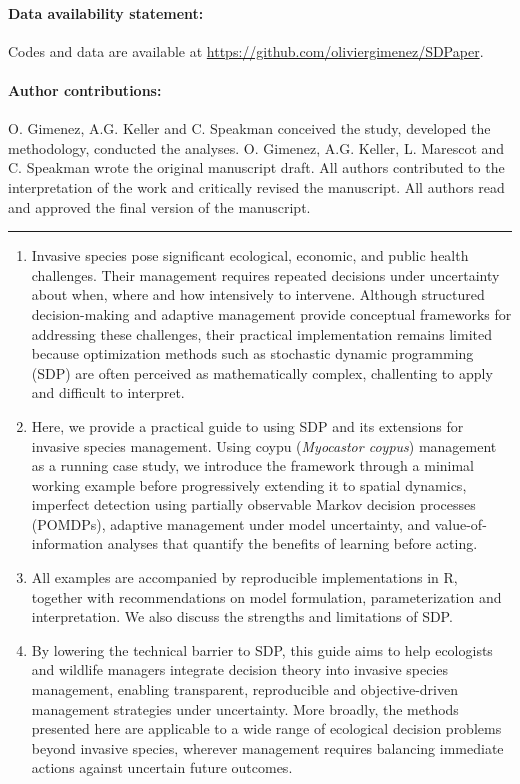 \documentclass[
  11pt,
  a4paper,
]{article}
\begin{document}
\paragraph{Data availability statement:}

Codes and data are available at \url{https://github.com/oliviergimenez/SDPaper}.

\paragraph{Author contributions:}

O. Gimenez, A.G. Keller and C. Speakman conceived the study, developed the methodology, conducted the analyses. O. Gimenez, A.G. Keller, L. Marescot and C. Speakman wrote the original manuscript draft. All authors contributed to the interpretation of the work and critically revised the manuscript. All authors read and approved the final version of the manuscript.

\newpage

\hrule

\begin{enumerate}
\def\labelenumi{\arabic{enumi}.}
\item
  Invasive species pose significant ecological, economic, and public health challenges. Their management requires repeated decisions under uncertainty about when, where and how intensively to intervene. Although structured decision-making and adaptive management provide conceptual frameworks for addressing these challenges, their practical implementation remains limited because optimization methods such as stochastic dynamic programming (SDP) are often perceived as mathematically complex, challenting to apply and difficult to interpret.
\item
  Here, we provide a practical guide to using SDP and its extensions for invasive species management. Using coypu (\emph{Myocastor coypus}) management as a running case study, we introduce the framework through a minimal working example before progressively extending it to spatial dynamics, imperfect detection using partially observable Markov decision processes (POMDPs), adaptive management under model uncertainty, and value-of-information analyses that quantify the benefits of learning before acting.
\item
  All examples are accompanied by reproducible implementations in R, together with recommendations on model formulation, parameterization and interpretation. We also discuss the strengths and limitations of SDP.
\item
  By lowering the technical barrier to SDP, this guide aims to help ecologists and wildlife managers integrate decision theory into invasive species management, enabling transparent, reproducible and objective-driven management strategies under uncertainty. More broadly, the methods presented here are applicable to a wide range of ecological decision problems beyond invasive species, wherever management requires balancing immediate actions against uncertain future outcomes.
\end{enumerate}
\end{document}
